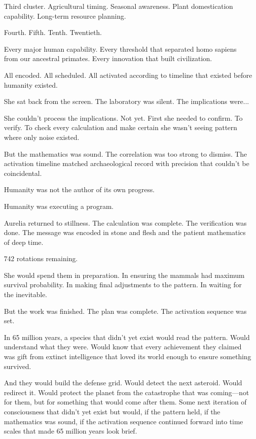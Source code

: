Third cluster. Agricultural timing. Seasonal awareness. Plant domestication capability. Long-term resource planning.

Fourth. Fifth. Tenth. Twentieth.

Every major human capability. Every threshold that separated homo sapiens from our ancestral primates. Every innovation that built civilization.

All encoded. All scheduled. All activated according to timeline that existed before humanity existed.

She sat back from the screen. The laboratory was silent. The implications were...

She couldn't process the implications. Not yet. First she needed to confirm. To verify. To check every calculation and make certain she wasn't seeing pattern where only noise existed.

But the mathematics was sound. The correlation was too strong to dismiss. The activation timeline matched archaeological record with precision that couldn't be coincidental.

Humanity was not the author of its own progress.

Humanity was executing a program.

\scenebreak

Aurelia returned to stillness. The calculation was complete. The verification was done. The message was encoded in stone and flesh and the patient mathematics of deep time.

742 rotations remaining.

She would spend them in preparation. In ensuring the mammals had maximum survival probability. In making final adjustments to the pattern. In waiting for the inevitable.

But the work was finished. The plan was complete. The activation sequence was set.

In 65 million years, a species that didn't yet exist would read the pattern. Would understand what they were. Would know that every achievement they claimed was gift from extinct intelligence that loved its world enough to ensure something survived.

And they would build the defense grid. Would detect the next asteroid. Would redirect it. Would protect the planet from the catastrophe that was coming—not for them, but for something that would come after them. Some next iteration of consciousness that didn't yet exist but would, if the pattern held, if the mathematics was sound, if the activation sequence continued forward into time scales that made 65 million years look brief.

